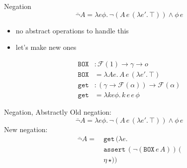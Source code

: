 \documentclass{beamer}
\newcommand{\lam}[2]{\lambda #1.\, #2}
\newcommand{\ap}[2]{#1\,#2}
\newcommand{\app}[3]{\ap{\ap{#1}{#2}}{#3}}
\newcommand{\appp}[4]{\ap{\ap{\ap{#1}{#2}}{#3}}{#4}}
\newcommand{\op}[1]{\mathtt{#1}}
\newcommand{\FF}{\mathcal{F}}
\newcommand{\boxop}{\texttt{BOX}}
\begin{document}
\begin{frame}{Negation}
  $$
  \bar{\lnot} A = \lam{e \phi}{\lnot(\app{A}{e}{(\lam{e'}{\top})}) \land \ap{\phi}{e}}
  $$
  \pause
  \begin{itemize}
  \item no abstract operations to handle this
  \item let's make new ones
  \end{itemize}
  \pause
  \begin{align*}
  \boxop &: \FF(1) \to \gamma \to o \\
  \boxop &= \lam{A e}{\app{A}{e}{(\lam{e'}{\top})}} \\
  \op{get} &: (\gamma \to \FF(\alpha)) \to \FF(\alpha) \\
  \op{get} &= \lam{k e \phi}{\appp{k}{e}{e}{\phi}}
  \end{align*}
\end{frame}

\begin{frame}{Negation, Abstractly}
  Old negation:
  $$
  \bar{\lnot} A = \lam{e \phi}{\lnot(\app{A}{e}{(\lam{e'}{\top})}) \land \ap{\phi}{e}}
  $$
  \pause
  \vfill
  New negation:
  \begin{align*}
    \bar{\lnot} A =\ & \ap{\op{get}}{(\lam{e}{ \\
                    & \app{\op{assert}}{(\lnot(\app{\boxop}{e}{A}))}{( \\
                     & \ap{\eta}{\star})}})}
  \end{align*}
\end{frame}
\end{document}

